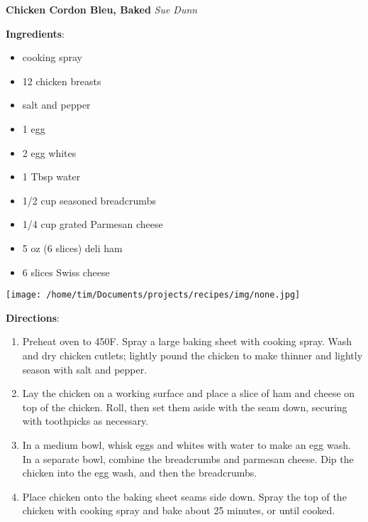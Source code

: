 \documentclass[11pt, twoside, openany]{book}
\begin{document}
\noindent\begin{minipage}[t]{\linewidth}%
{\Large\textbf{Chicken Cordon Bleu, Baked}} \label{chicken-cordon-bleu,-baked}\hfill\textit{Sue Dunn}\\
\noindent\begin{minipage}[t]{0.78\linewidth}%
\textbf{Ingredients}:\vspace{-3mm}
\begin{multicols}{2}
\begin{itemize}\setlength\itemsep{-1mm}
\item cooking spray
\item 12 chicken breasts
\item salt and pepper
\item 1 egg
\item 2 egg whites
\item 1 Tbsp water
\item 1/2 cup seasoned breadcrumbs
\item 1/4 cup grated Parmesan cheese
\item 5 oz (6 slices) deli ham
\item 6 slices Swiss cheese
\end{itemize}
\end{multicols}
\end{minipage}
\noindent\begin{minipage}[t]{0.18\linewidth}
\centering \strut\vspace*{-\baselineskip}\newline
\texttt{[image: /home/tim/Documents/projects/recipes/img/none.jpg]}\\
\end{minipage}\vspace{3mm}
\textbf{Directions}:
\vspace{-3mm}\begin{enumerate}\setlength\itemsep{-1mm}
\item Preheat oven to 450F. Spray a large baking sheet with cooking spray. Wash and dry chicken cutlets; lightly pound the chicken to make thinner and lightly season with salt and pepper.
\item Lay the chicken on a working surface and place a slice of ham and cheese on top of the chicken. Roll, then set them aside with the seam down, securing with toothpicks as necessary.
\item In a medium bowl, whisk eggs and whites with water to make an egg wash. In a separate bowl, combine the breadcrumbs and parmesan cheese. Dip the chicken into the egg wash, and then the breadcrumbs.
\item Place chicken onto the baking sheet seams side down. Spray the top of the chicken with cooking spray and bake about 25 minutes, or until cooked.
\end{enumerate}
\end{minipage}\vspace{8mm}
\end{document}
